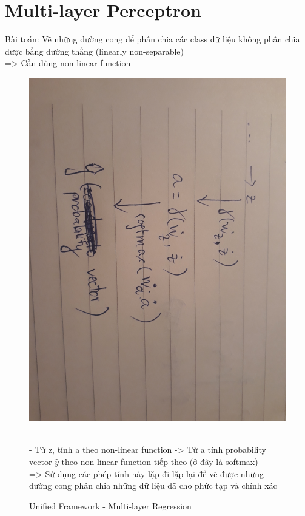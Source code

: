 \documentclass{article}
\begin{document}
\section{Multi-layer Perceptron}
Bài toán: Vẽ những đường cong để phân chia các class dữ liệu không phân chia được bằng đường thẳng (linearly non-separable)\\
=> Cần dùng non-linear function 
\begin{figure}[ht]

\begin{center}

\includegraphics[scale=0.1]{20190703_013016.jpg}\\

\end{center}

\caption{Unified Framework - Multi-layer Regression}\\

- Từ z, tính a theo non-linear function -> Từ a tính probability vector $\hat{y}$ theo non-linear function tiếp theo (ở đây là softmax) \\ 
=> Sử dụng các phép tính này lặp đi lặp lại để vẽ được những đường cong phân chia những dữ liệu đã cho phức tạp và chính xác

\end{figure}
\end{document}
